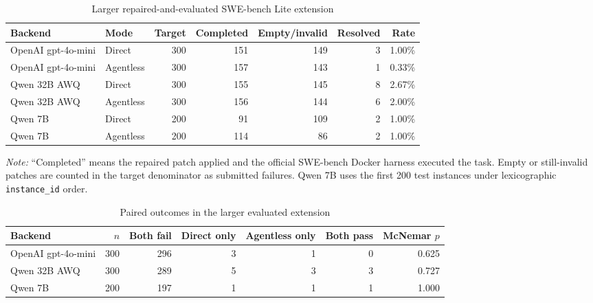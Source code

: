 \documentclass[preprint,12pt]{elsarticle}
\begin{document}
\begin{table}[htbp]
\centering
\caption{Larger repaired-and-evaluated SWE-bench Lite extension}
\label{tab:extension_status}
\scriptsize
\begin{adjustbox}{max width=0.96\linewidth}
\begin{tabular}{llrrrrr}
\toprule
Backend & Mode & Target & Completed & Empty/invalid & Resolved & Rate \\
\midrule
OpenAI gpt-4o-mini & Direct & 300 & 151 & 149 & 3 & 1.00\% \\
OpenAI gpt-4o-mini & Agentless & 300 & 157 & 143 & 1 & 0.33\% \\
Qwen 32B AWQ & Direct & 300 & 155 & 145 & 8 & 2.67\% \\
Qwen 32B AWQ & Agentless & 300 & 156 & 144 & 6 & 2.00\% \\
Qwen 7B & Direct & 200 & 91 & 109 & 2 & 1.00\% \\
Qwen 7B & Agentless & 200 & 114 & 86 & 2 & 1.00\% \\
\bottomrule
\end{tabular}
\end{adjustbox}
\begin{minipage}{0.92\linewidth}
\footnotesize\textit{Note:} ``Completed'' means the repaired patch applied and the official SWE-bench Docker harness executed the task. Empty or still-invalid patches are counted in the target denominator as submitted failures. Qwen 7B uses the first 200 test instances under lexicographic \texttt{instance\_id} order.
\end{minipage}
\end{table}

\begin{table}[htbp]
\centering
\caption{Paired outcomes in the larger evaluated extension}
\label{tab:extension_pairs}
\scriptsize
\begin{adjustbox}{max width=0.96\linewidth}
\begin{tabular}{lrrrrrr}
\toprule
Backend & $n$ & Both fail & Direct only & Agentless only & Both pass & McNemar $p$ \\
\midrule
OpenAI gpt-4o-mini & 300 & 296 & 3 & 1 & 0 & 0.625 \\
Qwen 32B AWQ & 300 & 289 & 5 & 3 & 3 & 0.727 \\
Qwen 7B & 200 & 197 & 1 & 1 & 1 & 1.000 \\
\bottomrule
\end{tabular}
\end{adjustbox}
\end{table}
\end{document}
